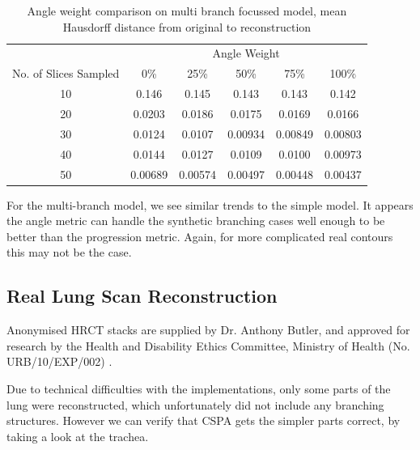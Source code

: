 \documentclass[11p, titlepage]{article}
\begin{document}
\begin{table}[h!]
\begin{tabular}{ | c | c | c | c | c | c | }
\hline
& \multicolumn{5}{c|}{Angle Weight} \\
\cline{2-6}
No. of Slices Sampled & 0\% & 25\% & 50\% & 75\% & 100\% \\
\hline
10 & 0.146 & 0.145 & 0.143 & 0.143 & 0.142 \\
20 & 0.0203 & 0.0186 & 0.0175 & 0.0169 & 0.0166 \\
30 & 0.0124 & 0.0107 & 0.00934 & 0.00849 & 0.00803 \\
40 & 0.0144 & 0.0127 & 0.0109 & 0.0100 & 0.00973 \\
50 & 0.00689 & 0.00574 & 0.00497 & 0.00448 & 0.00437 \\
\hline
\end{tabular}
\caption{Angle weight comparison on multi branch focussed model, mean Hausdorff distance from original to reconstruction}
\label{table:ang_weight_multi_branch_focussed_forward_transpose}
\end{table}

For the multi-branch model, we see similar trends to the simple model. It appears the angle metric can handle the synthetic branching cases well enough to be better than the progression metric. Again, for more complicated real contours this may not be the case.
\pagebreak

\subsection{Real Lung Scan Reconstruction}

Anonymised HRCT stacks are supplied by Dr. Anthony Butler, and approved for research by the Health and Disability Ethics Committee, Ministry of Health (No. URB/10/EXP/002) \cite{health2010annual}.

Due to technical difficulties with the implementations, only some parts of the lung were reconstructed, which unfortunately did not include any branching structures. However we can verify that CSPA gets the simpler parts correct, by taking a look at the trachea.
\end{document}

